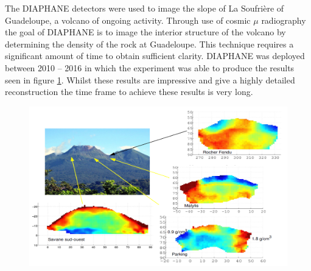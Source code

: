 The DIAPHANE detectors were used to image the slope of La Soufrière of Guadeloupe, a volcano of ongoing activity. Through use of cosmic $\mu$ radiography the goal of DIAPHANE is to image the interior structure of the volcano by determining the density of the rock at Guadeloupe. This technique requires a significant amount of time to obtain sufficient clarity. DIAPHANE was deployed between 2010 -- 2016 in which the experiment was able to produce the results seen in figure \ref{fig:diaphaneStructualImaging}. Whilst these results are impressive and give a highly detailed reconstruction the time frame to achieve these results is very long. 

\begin{figure}[!h]
 \centering
 \includegraphics[width=1.0\linewidth]{Chapter5/Figs/Raster/diaphane_structuralImaging.png}
 \label{fig:diaphaneStructualImaging}
\end{figure}

